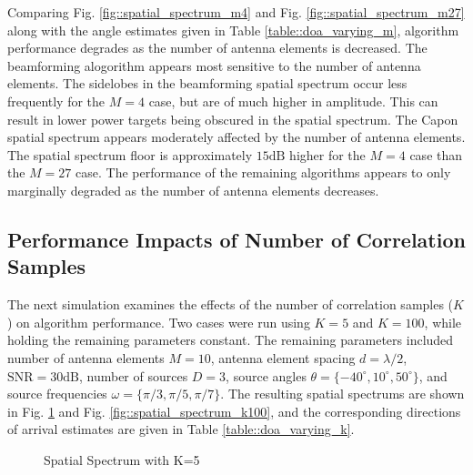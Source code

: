\documentclass[conference]{IEEEtran}
\begin{document}
		Comparing Fig. \ref{fig::spatial_spectrum_m4} and Fig. \ref{fig::spatial_spectrum_m27} along with the angle estimates given in Table \ref{table::doa_varying_m}, algorithm performance degrades as the number of antenna elements is decreased. The beamforming alogorithm appears most sensitive to the number of antenna elements. The sidelobes in the beamforming spatial spectrum occur less frequently for the $M=4$ case, but are of much higher in amplitude. This can result in lower power targets being obscured in the spatial spectrum. The Capon spatial spectrum appears moderately affected by the number of antenna elements. The spatial spectrum floor is approximately $15\text{dB}$ higher for the $M=4$ case than the $M=27$ case. The performance of the remaining algorithms appears to only marginally degraded as the number of antenna elements decreases.
		
		\subsection{Performance Impacts of Number of Correlation Samples}
		
		The next simulation examines the effects of the number of correlation samples ($K$) on algorithm performance. Two cases were run using $K=5$ and $K=100$, while holding the remaining parameters constant. The remaining parameters included number of antenna elements $M=10$, antenna element spacing $d = \lambda/2$, $\text{SNR}=30\text{dB}$, number of sources $D=3$, source angles $\theta = \{-40^{\circ}, 10^{\circ}, 50^{\circ}\}$, and source frequencies $\omega = \{\pi/3, \pi/5, \pi/7\}$. The resulting spatial spectrums are shown in Fig. \ref{fig::spatial_spectrum_k5} and Fig. \ref{fig::spatial_spectrum_k100}, and the corresponding directions of arrival estimates are given in Table \ref{table::doa_varying_k}.
		
		\begin{figure}
			\centerline{}
			\caption{Spatial Spectrum with K=5}
			\label{fig::spatial_spectrum_k5}
		\end{figure}
		
\end{document}

